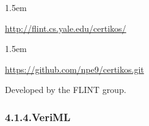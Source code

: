 \documentclass[12pt,twoside]{article}
\begin{document}
\begin{mddefinitions}%


\begin{mdbmarginx}{}{}{}{1.5em}%
\begin{mddefdata}%
\href{http://flint.cs.yale.edu/certikos/}{{\ttfamily http://\hspace{0pt}flint.\hspace{0pt}cs.\hspace{0pt}yale.\hspace{0pt}edu/\hspace{0pt}certikos/\hspace{0pt}}}
\end{mddefdata}%
\end{mdbmarginx}%


\begin{mdbmarginx}{}{}{}{1.5em}%
\begin{mddefdata}%
\href{https://github.com/npe9/certikos.git}{{\ttfamily https://\hspace{0pt}github.\hspace{0pt}com/\hspace{0pt}npe9/\hspace{0pt}certikos.\hspace{0pt}git}}%
\end{mddefdata}%
\end{mdbmarginx}%
\end{mddefinitions}%

\noindent{}Developed by the FLINT group.%

\subsubsection{4.1.4.\hspace*{0.5em}VeriML}%
\end{document}

